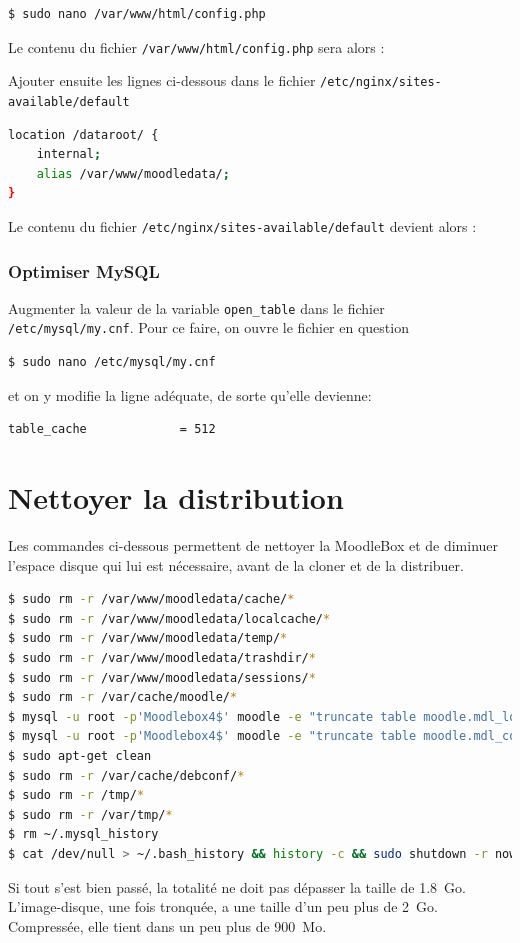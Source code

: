 \documentclass[11pt]{article}
\begin{document}
\begin{lstlisting}[language=bash]
$ sudo nano /var/www/html/config.php
\end{lstlisting}

Le contenu du fichier \lstinline{/var/www/html/config.php} sera alors : 


Ajouter ensuite les lignes ci-dessous dans le fichier \lstinline{/etc/nginx/sites-available/default}

\begin{lstlisting}[language=bash]
location /dataroot/ {
    internal;
    alias /var/www/moodledata/;
}
\end{lstlisting}

Le contenu du fichier \lstinline{/etc/nginx/sites-available/default} devient alors : 


\subsubsection{Optimiser MySQL}

Augmenter la valeur de la variable \lstinline{open_table} dans le fichier \lstinline{/etc/mysql/my.cnf}. Pour ce faire, on ouvre le fichier en question
\begin{lstlisting}[language=bash]
$ sudo nano /etc/mysql/my.cnf
\end{lstlisting}

et on y modifie la ligne adéquate, de sorte qu'elle devienne:
\begin{lstlisting}[language=bash]
table_cache             = 512
\end{lstlisting}

\section{Nettoyer la distribution}

Les commandes ci-dessous permettent de nettoyer la MoodleBox et de diminuer l'espace disque qui lui est nécessaire, avant de la cloner et de la distribuer.

\begin{lstlisting}[language=bash]
$ sudo rm -r /var/www/moodledata/cache/*
$ sudo rm -r /var/www/moodledata/localcache/*
$ sudo rm -r /var/www/moodledata/temp/*
$ sudo rm -r /var/www/moodledata/trashdir/*
$ sudo rm -r /var/www/moodledata/sessions/*
$ sudo rm -r /var/cache/moodle/*
$ mysql -u root -p'Moodlebox4$' moodle -e "truncate table moodle.mdl_logstore_standard_log"
$ mysql -u root -p'Moodlebox4$' moodle -e "truncate table moodle.mdl_config_log"
$ sudo apt-get clean
$ sudo rm -r /var/cache/debconf/*
$ sudo rm -r /tmp/*
$ sudo rm -r /var/tmp/*
$ rm ~/.mysql_history
$ cat /dev/null > ~/.bash_history && history -c && sudo shutdown -r now
\end{lstlisting}

Si tout s'est bien passé, la totalité ne doit pas dépasser la taille de 1.8~Go. L'image-disque, une fois tronquée, a une taille d'un peu plus de 2~Go. Compressée, elle tient dans un peu plus de 900~Mo. 
\end{document}
